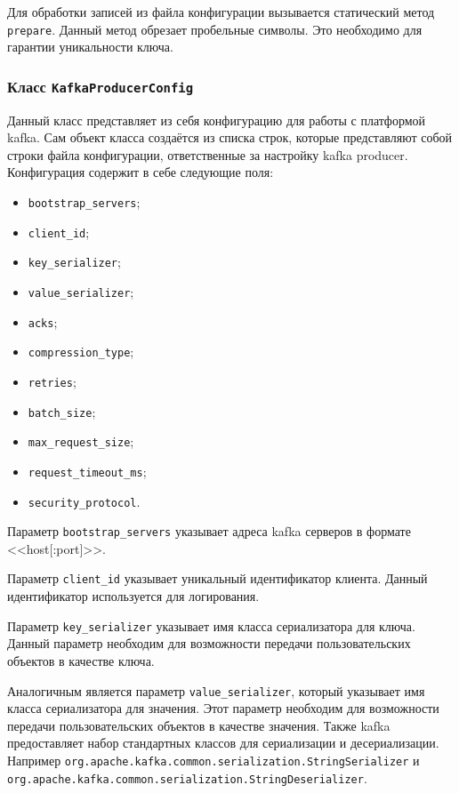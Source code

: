 Для обработки записей из файла конфигурации вызывается статический метод \texttt{prepare}.
Данный метод обрезает пробельные символы.
Это необходимо для гарантии уникальности ключа.

\subsubsection{Класс \texttt{KafkaProducerConfig}}

Данный класс представляет из себя конфигурацию для работы с платформой kafka.
Сам объект класса создаётся из списка строк, которые представляют собой строки файла конфигурации, ответственные за настройку kafka producer.
Конфигурация содержит в себе следующие поля:
\begin{itemize}
    \item \texttt{bootstrap\_servers};
    \item \texttt{client\_id};
    \item \texttt{key\_serializer};
    \item \texttt{value\_serializer};
    \item \texttt{acks};
    \item \texttt{compression\_type};
    \item \texttt{retries};
    \item \texttt{batch\_size};
    \item \texttt{max\_request\_size};
    \item \texttt{request\_timeout\_ms};
    \item \texttt{security\_protocol}.
\end{itemize}

Параметр \texttt{bootstrap\_servers} указывает адреса kafka серверов в формате <<host[:port]>>.

Параметр \texttt{client\_id} указывает уникальный идентификатор клиента.
Данный идентификатор используется для логирования.

Параметр \texttt{key\_serializer} указывает имя класса сериализатора для ключа.
Данный параметр необходим для возможности передачи пользовательских объектов в качестве ключа.

Аналогичным является параметр \texttt{value\_serializer}, который указывает имя класса сериализатора для значения.
Этот параметр необходим для возможности передачи пользовательских объектов в качестве значения.
Также kafka предоставляет набор стандартных классов для сериализации и десериализации.
Например \texttt{org.apache.kafka.common.serialization.StringSerializer} и \texttt{org.apache.kafka.common.serialization.StringDeserializer}.

